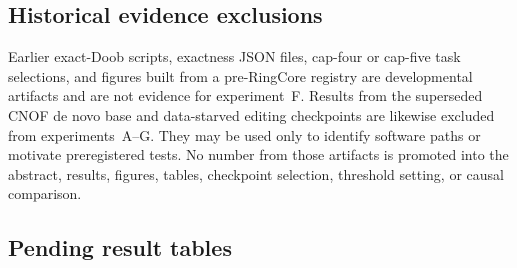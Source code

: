 \documentclass{article}
\theoremstyle{definition}
\theoremstyle{remark}
\begin{document}
\subsection{Historical evidence exclusions}\label{app:barrier}
\label{app:baseb}

Earlier exact-Doob scripts, exactness JSON files, cap-four or cap-five task selections, and figures built from a pre-RingCore registry are developmental artifacts and are not evidence for experiment~F. Results from the superseded CNOF de novo base and data-starved editing checkpoints are likewise excluded from experiments~A--G. They may be used only to identify software paths or motivate preregistered tests. No number from those artifacts is promoted into the abstract, results, figures, tables, checkpoint selection, threshold setting, or causal comparison.

\subsection{Pending result tables}\label{app:pending}
\end{document}
